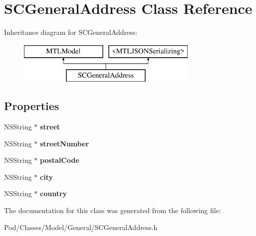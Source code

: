 \hypertarget{interface_s_c_general_address}{}\section{S\+C\+General\+Address Class Reference}
\label{interface_s_c_general_address}
Inheritance diagram for S\+C\+General\+Address\+:\begin{figure}[H]
\begin{center}
\leavevmode
\includegraphics[height=2.000000cm]{interface_s_c_general_address}
\end{center}
\end{figure}
\subsection*{Properties}
\begin{DoxyCompactItemize}
\item 
N\+S\+String $\ast$ {\bfseries street}\hypertarget{interface_s_c_general_address_adef2c950c6a4306444b2e3259369efec}{}\label{interface_s_c_general_address_adef2c950c6a4306444b2e3259369efec}

\item 
N\+S\+String $\ast$ {\bfseries street\+Number}\hypertarget{interface_s_c_general_address_a89babcf387d72b36d2534671ff2c6189}{}\label{interface_s_c_general_address_a89babcf387d72b36d2534671ff2c6189}

\item 
N\+S\+String $\ast$ {\bfseries postal\+Code}\hypertarget{interface_s_c_general_address_a3af405ea3604e29bb505c3a91caf59d2}{}\label{interface_s_c_general_address_a3af405ea3604e29bb505c3a91caf59d2}

\item 
N\+S\+String $\ast$ {\bfseries city}\hypertarget{interface_s_c_general_address_ac1193651a61d384701247779fcc4cae6}{}\label{interface_s_c_general_address_ac1193651a61d384701247779fcc4cae6}

\item 
N\+S\+String $\ast$ {\bfseries country}\hypertarget{interface_s_c_general_address_ada5551a73de51d008d9a86c8102c9fe3}{}\label{interface_s_c_general_address_ada5551a73de51d008d9a86c8102c9fe3}

\end{DoxyCompactItemize}


The documentation for this class was generated from the following file\+:\begin{DoxyCompactItemize}
\item 
Pod/\+Classes/\+Model/\+General/S\+C\+General\+Address.\+h\end{DoxyCompactItemize}
